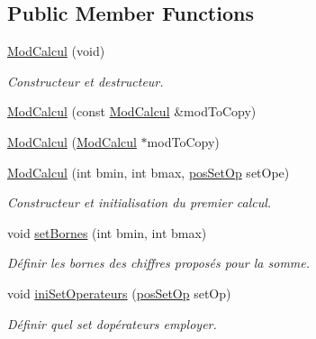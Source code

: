 \subsection*{Public Member Functions}
\begin{DoxyCompactItemize}
\item 
\mbox{\label{class_mod_calcul_ac5da8ccb4058c1c3aa3ee15a60572f23}} 
\hyperlink{class_mod_calcul_ac5da8ccb4058c1c3aa3ee15a60572f23}{Mod\+Calcul} (void)
\begin{DoxyCompactList}\small\item\em Constructeur et destructeur. \end{DoxyCompactList}\item 
\hyperlink{class_mod_calcul_a80ee3b9e056beb4942449219ac036e6e}{Mod\+Calcul} (const \hyperlink{class_mod_calcul}{Mod\+Calcul} \&mod\+To\+Copy)
\item 
\hyperlink{class_mod_calcul_ad10f52bb861bf4b76e12f5bba1d97b67}{Mod\+Calcul} (\hyperlink{class_mod_calcul}{Mod\+Calcul} $\ast$mod\+To\+Copy)
\item 
\mbox{\label{class_mod_calcul_a28524d6936ea23d374b01d8b0f8feba2}} 
\hyperlink{class_mod_calcul_a28524d6936ea23d374b01d8b0f8feba2}{Mod\+Calcul} (int bmin, int bmax, \hyperlink{class_mod_calcul_a6c7aa1fa9a9cf577567da286e26596ce}{pos\+Set\+Op} set\+Ope)
\begin{DoxyCompactList}\small\item\em Constructeur et initialisation du premier calcul. \end{DoxyCompactList}\item 
\mbox{\label{class_mod_calcul_a3bc78a2a5165705dc3f15f516b6dc22c}} 
void \hyperlink{class_mod_calcul_a3bc78a2a5165705dc3f15f516b6dc22c}{set\+Bornes} (int bmin, int bmax)
\begin{DoxyCompactList}\small\item\em Définir les bornes des chiffres proposés pour la somme. \end{DoxyCompactList}\item 
void \hyperlink{class_mod_calcul_ad6061decce032f0debf6fa79d153df5d}{ini\+Set\+Operateurs} (\hyperlink{class_mod_calcul_a6c7aa1fa9a9cf577567da286e26596ce}{pos\+Set\+Op} set\+Op)
\begin{DoxyCompactList}\small\item\em Définir quel set d\textquotesingle{}opérateurs employer. \end{DoxyCompactList}\item 

\end{DoxyCompactItemize}
